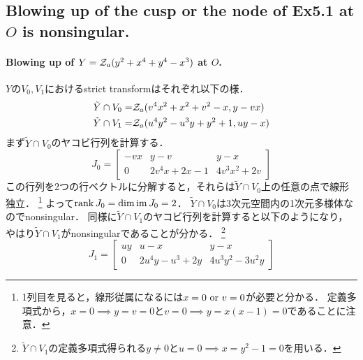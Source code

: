 \documentclass[a4paper]{jsarticle}
\begin{document}
    \subsection{Blowing up of the cusp or the node of Ex5.1 at $O$ is nonsingular.}
    \paragraph{Blowing up of $Y=\mathcal{Z}_a(y^2+x^4+y^4-x^3)$ at $O$.}
    $Y$の$V_0, V_1$におけるstrict transformはそれぞれ以下の様．
    \begin{align*}
        \tilde{Y} \cap V_0=& \mathcal{Z}_a(v^4 x^2+x^2+v^2-x, y-vx) \\
        \tilde{Y} \cap V_1=& \mathcal{Z}_a(u^4 y^2-u^3y+y^2+1, uy-x)
    \end{align*}
    まず$\tilde{Y} \cap V_0$のヤコビ行列を計算する．
    \[
        J_0=
        \begin{bmatrix}
            -vx & y-v & y-x \\
            0 & 2v^4x+2x-1 & 4v^3x^2+2v
        \end{bmatrix}
    \]
    この行列を2つの行ベクトルに分解すると，それらは$\tilde{Y} \cap V_0$上の任意の点で線形独立．
    \footnote{1列目を見ると，線形従属になるには$x=0 \text{ or } v=0$が必要と分かる．
    定義多項式から，$x=0 \implies y=v=0$と$v=0 \implies y=x(x-1)=0$であることに注意．}
    よって$\operatorname{rank} J_0=\dim \operatorname{im} J_0=2$．
    $\tilde{Y} \cap V_0$は3次元空間内の1次元多様体なのでnonsingular．
    同様に$\tilde{Y} \cap V_1$のヤコビ行列を計算すると以下のようになり，
    やはり$\tilde{Y} \cap V_1$がnonsingularであることが分かる．
    \footnote{$\tilde{Y} \cap V_1$の定義多項式得られる$y \neq 0$と$u=0 \implies x=y^2-1=0$を用いる．}
    \[
        J_1=
        \begin{bmatrix}
            uy & u-x & y-x \\
            0 & 2u^4 y-u^3+2y & 4u^3 y^2-3u^2y
        \end{bmatrix}
    \]
\end{document}

